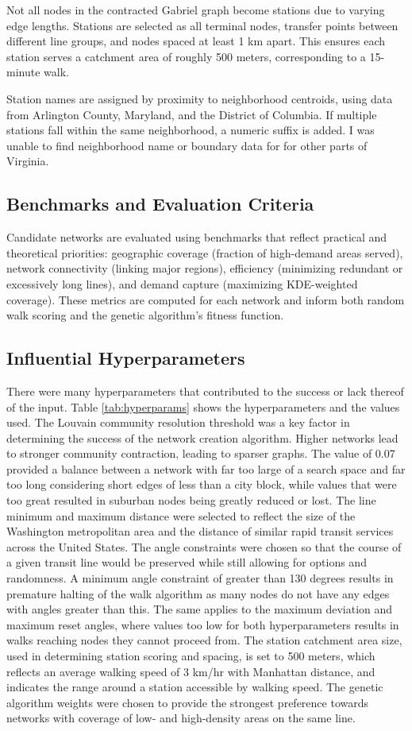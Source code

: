 \documentclass[manuscript,nonacm]{acmart}
\begin{document}
Not all nodes in the contracted Gabriel graph become stations due to varying edge lengths. Stations are selected as all terminal nodes, transfer points between different line groups, and nodes spaced at least 1 km apart. This ensures each station serves a catchment area of roughly 500 meters, corresponding to a 15-minute walk.

Station names are assigned by proximity to neighborhood centroids, using data from Arlington County, Maryland, and the District of Columbia. If multiple stations fall within the same neighborhood, a numeric suffix is added. I was unable to find neighborhood name or boundary data for for other parts of Virginia.

\subsection{Benchmarks and Evaluation Criteria}
Candidate networks are evaluated using benchmarks that reflect practical and theoretical priorities: geographic coverage (fraction of high-demand areas served), network connectivity (linking major regions), efficiency (minimizing redundant or excessively long lines), and demand capture (maximizing KDE-weighted coverage). These metrics are computed for each network and inform both random walk scoring and the genetic algorithm's fitness function.

\subsection{Influential Hyperparameters}
There were many hyperparameters that contributed to the success or lack thereof of the input. Table \ref{tab:hyperparams} shows the hyperparameters and the values used. The Louvain community resolution threshold was a key factor in determining the success of the network creation algorithm. Higher networks lead to stronger community contraction, leading to sparser graphs. The value of 0.07 provided a balance between a network with far too large of a search space and far too long considering short edges of less than a city block, while values that were too great resulted in suburban nodes being greatly reduced or lost. The line minimum and maximum distance were selected to reflect the size of the Washington metropolitan area and the distance of similar rapid transit services across the United States. The angle constraints were chosen so that the course of a given transit line would be preserved while still allowing for options and randomness. A minimum angle constraint of greater than 130 degrees results in premature halting of the walk algorithm as many nodes do not have any edges with angles greater than this. The same applies to the maximum deviation and maximum reset angles, where values too low for both hyperparameters results in walks reaching nodes they cannot proceed from. The station catchment area size, used in determining station scoring and spacing, is set to 500 meters, which reflects an average walking speed of 3 km/hr with Manhattan distance, and indicates the range around a station accessible by walking speed. The genetic algorithm weights were chosen to provide the strongest preference towards networks with coverage of low- and high-density areas on the same line. 
\end{document}
